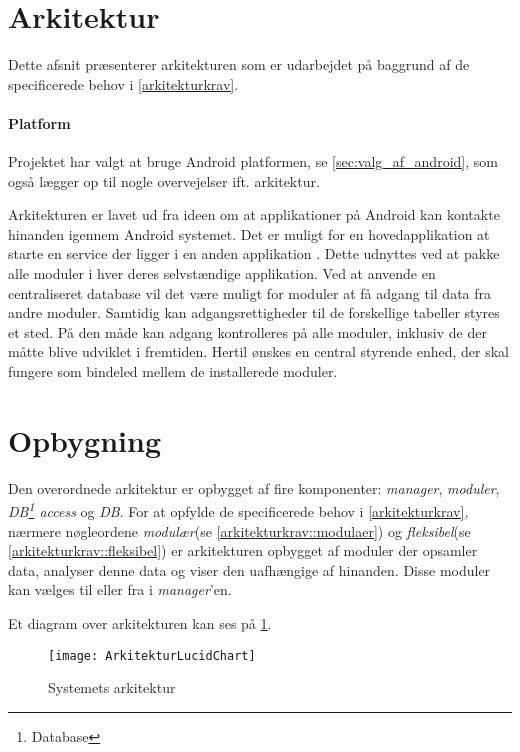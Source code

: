 \section{Arkitektur}\label{sec:arkitektur}
Dette afsnit præsenterer arkitekturen som er udarbejdet på baggrund af de specificerede behov i \cref{arkitekturkrav}.

\paragraph{Platform}
Projektet har valgt at bruge Android platformen, se \cref{sec:valg_af_android}, som også lægger op til nogle overvejelser ift. arkitektur.

Arkitekturen er lavet ud fra ideen om at applikationer på Android kan kontakte hinanden igennem Android systemet.
Det er muligt for en hovedapplikation at starte en service der ligger i en anden applikation \cite{android_service}.
Dette udnyttes ved at pakke alle moduler i hver deres selvstændige applikation.
Ved at anvende en centraliseret database vil det være muligt for moduler at få adgang til data fra andre moduler.
Samtidig kan adgangsrettigheder til de forskellige tabeller styres et sted.
På den måde kan adgang kontrolleres på alle moduler, inklusiv de der måtte blive udviklet i fremtiden.
Hertil ønskes en central styrende enhed, der skal fungere som bindeled mellem de installerede moduler.

\section{Opbygning}\label{arkitektur:opbygning}
Den overordnede arkitektur er opbygget af fire komponenter: \textit{manager}, \textit{moduler}, \textit{DB\footnote{Database} access} og \textit{DB}.
For at opfylde de specificerede behov i \cref{arkitekturkrav}, nærmere nøgleordene \textit{modulær}(se \cref{arkitekturkrav::modulaer}) og \textit{fleksibel}(se \cref{arkitekturkrav::fleksibel}) er arkitekturen opbygget af moduler der opsamler data, analyser denne data og viser den uafhængige af hinanden.
Disse moduler kan vælges til eller fra i \textit{manager}'en.


Et diagram over arkitekturen kan ses på \cref{arkitektur_udkast_1}.
\begin{figure}[h]
	\centering						%
	\texttt{[image: ArkitekturLucidChart]}
	\caption{Systemets arkitektur}
  \label{arkitektur_udkast_1}
\end{figure}

